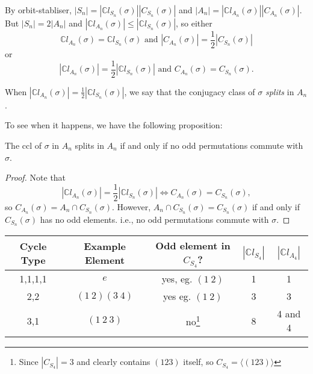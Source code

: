\documentclass[a4paper]{article}
\begin{document}
      By orbit-stabliser, $ |S_n|=|\mathbb{C}l_{S_n}(\sigma)||C_{S_n}(\sigma)| $ and $ |A_n|=|\mathbb{C}l_{A_n}(\sigma)||C_{A_n}(\sigma)| $. But $ |S_n|=2|A_n| $ and $ |\mathbb{C}l_{A_n}(\sigma)|\le |\mathbb{C}l_{S_n}(\sigma)| $, so either
      \[
        \mathbb{C}l_{A_n}(\sigma)=\mathbb{C}l_{S_n}(\sigma) \text{ and } |C_{A_n}(\sigma)|=\frac{1}{2}|C_{S_n}(\sigma)|
      \]
      or
      \[
        |\mathbb{C}l_{A_n}(\sigma)|=\frac{1}{2} |\mathbb{C}l_{S_n}(\sigma)|\text{ and } C_{A_n}(\sigma)=C_{S_n}(\sigma)
      .\]
      \begin{definition}
          When $|\mathbb{C}l_{A_n}(\sigma)|=\frac{1}{2} |\mathbb{C}l_{S_n}(\sigma)|$, we say that the conjugacy class of $ \sigma $ \textit{splits} in $A_n$.
      \end{definition}
      To see when it happens, we have the following proposition:
      \begin{proposition}\label{prop:5.28}
          The ccl of $ \sigma $ in $A_n$ splits in $A_n$ if and only if no odd permutations commute with $\sigma$.
      \end{proposition}
      \begin{proof}
          Note that 
          \[
            |\mathbb{C}l_{A_n}(\sigma)|=\frac{1}{2} |\mathbb{C}l_{S_n}(\sigma)| \Longleftrightarrow C_{A_n}(\sigma)=C_{S_n}(\sigma)
          ,\]
          so $ C_{A_n}(\sigma)=A_n \cap C_{S_n}(\sigma) $. However, $ A_n \cap C_{S_n}(\sigma) =C_{S_n}(\sigma) $ if and only if $C_{S_n}(\sigma)$ has no odd elements. i.e., no odd permutations commute with $ \sigma $.
      \end{proof}
      \begin{example}
        \begin{center}
            \begin{tabular}{c|c|c|c|c}
                Cycle Type & Example Element & Odd element in $C_{S_4}$? & $|\mathbb{C}l_{S_4}|$ & $|\mathbb{C}l_{A_4}|$ \\
                \hline 
                1,1,1,1 & $e$ & yes, eg. $(1\ 2)$ & 1 & 1\\
                2,2 & $(1\ 2)(3\ 4)$ & yes eg. $(1\ 2)$ & 3 & 3\\
                3,1 & $(1\ 2\ 3)$ & no\footnote{Since $ |C_{S_4}|=3 $ and clearly contains $(123)$ itself, so $ C_{S_4}=\langle (123) \rangle $} & 8 & 4 and 4\\
            \end{tabular}
        \end{center}
      \end{example}
\end{document}
